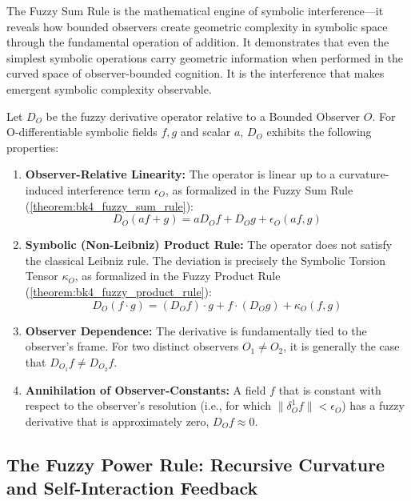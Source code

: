 The Fuzzy Sum Rule is the mathematical engine of symbolic interference—it reveals how bounded observers create geometric complexity in symbolic space through the fundamental operation of addition. It demonstrates that even the simplest symbolic operations carry geometric information when performed in the curved space of observer-bounded cognition. It is the interference that makes emergent symbolic complexity observable.

\begin{proposition}\label{prop:fuzzy_deriv_algebra}
Let $D_O$ be the fuzzy derivative operator relative to a Bounded Observer $O$. For O-differentiable symbolic fields $f, g$ and scalar $a$, $D_O$ exhibits the following properties:
\begin{enumerate}
    \item \textbf{Observer-Relative Linearity:} The operator is linear up to a curvature-induced interference term $\epsilon_O$, as formalized in the Fuzzy Sum Rule (\ref{theorem:bk4_fuzzy_sum_rule}):
    \begin{equation}
        D_O(af + g) = a D_O f + D_O g + \epsilon_O(af, g)
    \end{equation}
    \item \textbf{Symbolic (Non-Leibniz) Product Rule:} The operator does not satisfy the classical Leibniz rule. The deviation is precisely the Symbolic Torsion Tensor $\kappa_O$, as formalized in the Fuzzy Product Rule (\ref{theorem:bk4_fuzzy_product_rule}):
    \begin{equation}
        D_O(f \cdot g) = (D_O f) \cdot g + f \cdot (D_O g) + \kappa_O(f,g)
    \end{equation}
    \item \textbf{Observer Dependence:} The derivative is fundamentally tied to the observer's frame. For two distinct observers $O_1 \neq O_2$, it is generally the case that $D_{O_1} f \neq D_{O_2} f$.
    \item \textbf{Annihilation of Observer-Constants:} A field $f$ that is constant with respect to the observer's resolution (i.e., for which $\|\delta_O^1 f\| < \epsilon_O$) has a fuzzy derivative that is approximately zero, $D_O f \approx 0$.
\end{enumerate}
\end{proposition}

\subsection{The Fuzzy Power Rule: Recursive Curvature and Self-Interaction Feedback}
\label{subsec:bk4_fuzzy_power_rule}

